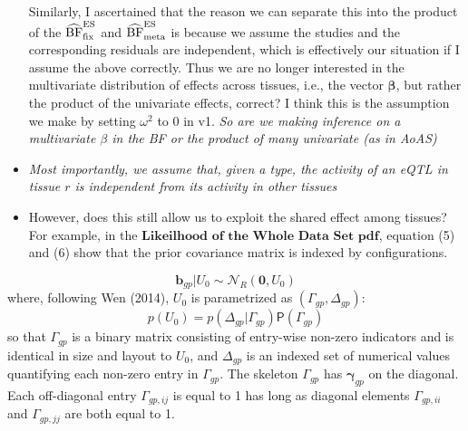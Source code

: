 \documentclass[10pt]{article}
\newcommand{\Prd}{\mathsf{P}} %
\newcommand{\Norm}{{\mathcal{N}}} %
\newcommand{\hbfesmeta}{\ensuremath{\widehat {{\rm BF}}^{\rm ES}_{\rm meta}}}
\newcommand{\hbfesfix}{\ensuremath{\widehat {{\rm BF}}^{\rm ES}_{\rm fix}}}
\begin{document}
\begin{itemize}
Similarly, I ascertained that the reason we can separate this into the product of the $\hbfesfix$ and $\hbfesmeta$ is because we assume the studies and the corresponding residuals are independent, which is effectively our situation if I assume the above correctly. Thus we are no longer interested in the multivariate distribution of effects across tissues, i.e., the vector $\mathbf \beta$, but rather the product of the univariate effects, correct? I think this is the assumption we make by setting $\omega ^{2}$ to 0 in v1. \emph { So are we making inference on a multivariate $\beta$ in the BF or the product of many univariate (as in AoAS)} 


\item \emph{Most importantly, we assume that, given a type, the activity of an eQTL in tissue $r$ is independent from its activity in other tissues}


\item However, does this still allow us to exploit the shared effect among tissues? For example, in the $\textbf{Likeilhood of the Whole Data Set pdf}$, equation (5) and (6) show that the prior covariance matrix is indexed by configurations.
\end{itemize}

\begin{equation}
  \bm{b}_{gp} | U_{0} \sim \Norm_R(\bm{0}, U_{0})
\end{equation}
where, following Wen (2014), $U_{0}$ is parametrized as $(\Gamma_{gp},\Delta_{gp})$:
\begin{equation}
  p(U_{0}) = p(\Delta_{gp} | \Gamma_{gp}) \Prd(\Gamma_{gp})
\end{equation}
so that $\Gamma_{gp}$ is a binary matrix consisting of entry-wise non-zero indicators and is identical in size and layout to $U_{0}$, and $\Delta_{gp}$ is an indexed set of numerical values quantifying each non-zero entry in $\Gamma_{gp}$.
The skeleton $\Gamma_{gp}$ has $\bm{\gamma}_{gp}$ on the diagonal. Each off-diagonal entry $\Gamma_{gp,ij}$ is equal to 1 has long as diagonal elements $\Gamma_{gp,ii}$ and $\Gamma_{gp,jj}$ are both equal to 1.
\end{document}
